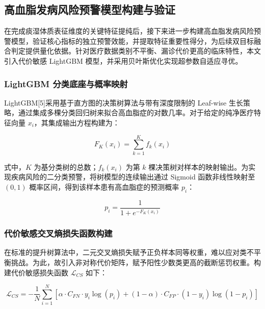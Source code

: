 \documentclass[12pt]{article}
\begin{document}
	\subsection{高血脂发病风险预警模型构建与验证}
	{\songti{}
		在完成痰湿体质表征维度的关键特征提纯后，接下来进一步构建高血脂发病风险预警模型，验证核心指标的独立预警效能，并提取特征重要性得分，为后续双目标融合判定提供量化依据。针对医疗数据类别不平衡、漏诊代价更高的临床特性，本文引入代价敏感 LightGBM 模型，并采用贝叶斯优化实现超参数自适应寻优。
		\par}
	
	\subsubsection{LightGBM 分类底座与概率映射}
	{\songti{}
		LightGBM[5]采用基于直方图的决策树算法与带有深度限制的 Leaf-wise 生长策略，通过集成多棵分类回归树来拟合高血脂症的对数几率。对于给定的纯净医疗特征向量 $x_i$，其集成输出方程构建为：
		\par}
	
	\begin{equation}
		F_K(x_i) = \sum_{k=1}^{K} f_k(x_i)
	\end{equation}
	
	
	{\songti{}
		式中，$K$ 为基分类树的总数；$f_k(x_i)$ 为第 $k$ 棵决策树对样本的映射输出。为实现疾病风险的二分类预警，将树模型的连续输出通过 Sigmoid 函数非线性映射至 $(0,1)$ 概率区间，得到该样本患有高血脂症的预测概率 $p_i$：
		\par}
	
	\begin{equation}
		p_i = \frac{1}{1 + e^{-F_K(x_i)}}
	\end{equation}
	
	\subsubsection{代价敏感交叉熵损失函数构建}
	{\songti{}
		在标准的提升树算法中，二元交叉熵损失赋予正负样本同等权重，难以应对类不平衡挑战。为此，故引入非对称代价矩阵，赋予阳性少数类更高的截断惩罚权重。构建代价敏感损失函数 $\mathcal{L}_{CS}$ 如下：
		\par}
	
	\begin{equation}
		\mathcal{L}_{CS} = -\frac{1}{N} \sum_{i=1}^{N} \left[ \alpha \cdot C_{FN} \cdot y_i \log(p_i) + (1-\alpha) \cdot C_{FP} \cdot (1-y_i) \log(1-p_i) \right]
	\end{equation}
	
\end{document}
